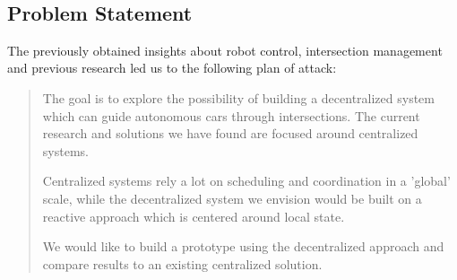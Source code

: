 
\\



\subsection{Problem Statement}
The previously obtained insights about robot control, intersection management and previous research led us to the following plan of attack:

\begin{quotation}
The goal is to explore the possibility of building a decentralized system which can guide autonomous cars through intersections. 
The current research and solutions we have found are focused around centralized systems. 

Centralized systems rely a lot on scheduling and coordination in a 'global' scale, 
while the decentralized system we envision would be built on a reactive approach which is centered around local state. 

We would like to build a prototype using the decentralized approach and compare results to an existing centralized solution.
\end{quotation}